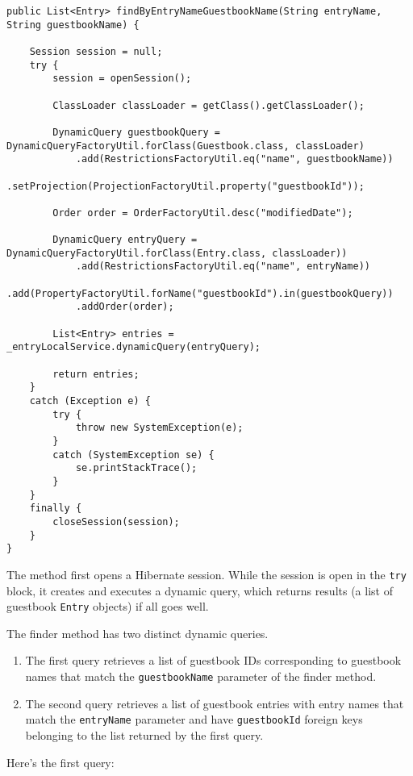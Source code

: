 \begin{verbatim}
public List<Entry> findByEntryNameGuestbookName(String entryName, String guestbookName) {

    Session session = null;
    try {
        session = openSession();

        ClassLoader classLoader = getClass().getClassLoader();

        DynamicQuery guestbookQuery = DynamicQueryFactoryUtil.forClass(Guestbook.class, classLoader)
            .add(RestrictionsFactoryUtil.eq("name", guestbookName))
            .setProjection(ProjectionFactoryUtil.property("guestbookId"));

        Order order = OrderFactoryUtil.desc("modifiedDate");

        DynamicQuery entryQuery = DynamicQueryFactoryUtil.forClass(Entry.class, classLoader))
            .add(RestrictionsFactoryUtil.eq("name", entryName))
            .add(PropertyFactoryUtil.forName("guestbookId").in(guestbookQuery))
            .addOrder(order);

        List<Entry> entries = _entryLocalService.dynamicQuery(entryQuery);

        return entries;
    }
    catch (Exception e) {
        try {
            throw new SystemException(e);
        }
        catch (SystemException se) {
            se.printStackTrace();
        }
    }
    finally {
        closeSession(session);
    }
}
\end{verbatim}

The method first opens a Hibernate session. While the session is open in
the \texttt{try} block, it creates and executes a dynamic query, which
returns results (a list of guestbook \texttt{Entry} objects) if all goes
well.

The finder method has two distinct dynamic queries.

\begin{enumerate}
\def\labelenumi{\arabic{enumi}.}
\item
  The first query retrieves a list of guestbook IDs corresponding to
  guestbook names that match the \texttt{guestbookName} parameter of the
  finder method.
\item
  The second query retrieves a list of guestbook entries with entry
  names that match the \texttt{entryName} parameter and have
  \texttt{guestbookId} foreign keys belonging to the list returned by
  the first query.
\end{enumerate}

Here's the first query:

